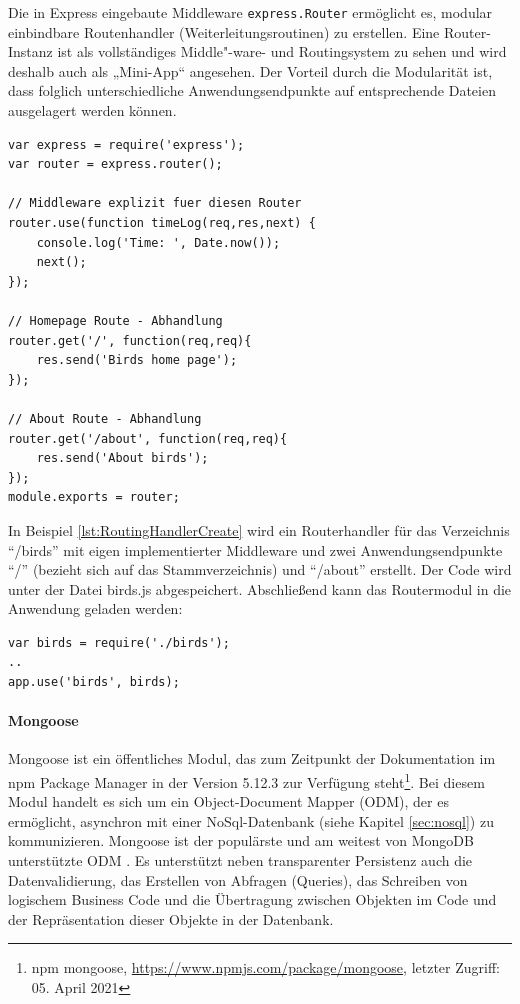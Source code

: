 \noindent
Die in Express eingebaute Middleware \texttt{express.Router} ermöglicht es, modular einbindbare Routenhandler (Weiterleitungsroutinen) zu erstellen. Eine Router-Instanz ist als vollständiges Middle"-ware- und Routingsystem zu sehen und wird deshalb auch als „Mini-App“ angesehen. Der Vorteil durch die Modularität ist, dass folglich unterschiedliche Anwendungsendpunkte auf entsprechende Dateien ausgelagert werden können.
\newline

\begin{lstlisting}[caption=Routinghandler erstellen \protect \footnotemark,label=lst:RoutingHandlerCreate]
var express = require('express');
var router = express.router();

// Middleware explizit fuer diesen Router
router.use(function timeLog(req,res,next) {
	console.log('Time: ', Date.now());
	next();
});

// Homepage Route - Abhandlung
router.get('/', function(req,req){
	res.send('Birds home page');
});

// About Route - Abhandlung
router.get('/about', function(req,req){
	res.send('About birds');
});
module.exports = router;
\end{lstlisting}

\noindent
In Beispiel \ref{lst:RoutingHandlerCreate} wird ein Routerhandler für das Verzeichnis \enquote{/birds} mit eigen implementierter Middleware und zwei Anwendungsendpunkte \enquote{/} (bezieht sich auf das Stammverzeichnis) und \enquote{/about} erstellt. Der Code wird unter der Datei birds.js abgespeichert.
Abschließend kann das Routermodul in die Anwendung geladen werden: 
\newline

\begin{lstlisting}[caption=Routinghandler benutzen,label=lst:RoutingHandlerUsage]
var birds = require('./birds');
..
app.use('birds', birds);
\end{lstlisting}

%
%
%

\newpage
\paragraph{Mongoose}
Mongoose ist ein öffentliches Modul, das zum Zeitpunkt der Dokumentation im npm Package Manager in der Version 5.12.3 zur Verfügung steht\footnote{npm mongoose, \url{https://www.npmjs.com/package/mongoose}, letzter Zugriff: 05. April 2021}. Bei diesem Modul handelt es sich um ein Object-Document Mapper (ODM), der es ermöglicht, asynchron mit einer NoSql-Datenbank (siehe Kapitel \ref{sec:nosql}) zu kommunizieren. Mongoose ist der populärste und am weitest von MongoDB unterstützte ODM \cite{Node2.55}. Es unterstützt neben transparenter Persistenz auch die Datenvalidierung, das Erstellen von Abfragen (Queries), das Schreiben von logischem Business Code und die Übertragung zwischen Objekten im Code und der Repräsentation dieser Objekte in der Datenbank.
\newline

